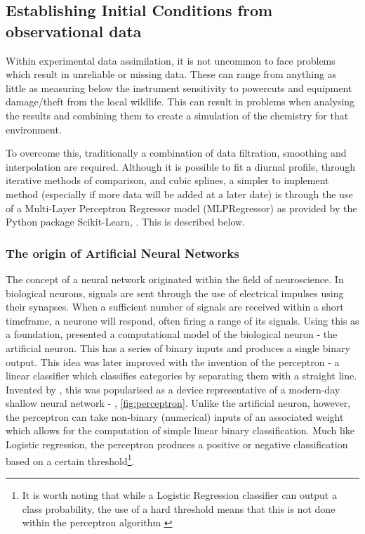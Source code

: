 \subsection{Establishing Initial Conditions from observational data}
Within experimental data assimilation, it is not uncommon to face problems which result in unreliable or missing data. These can range from anything as little as measuring below the instrument sensitivity to powercuts and equipment damage/theft from the local wildlife. This can result in problems when analysing the results and combining them to create a simulation of the chemistry for that environment. 

To overcome this, traditionally a combination of data filtration, smoothing and interpolation are required. Although it is possible to fit a diurnal profile, through iterative methods of comparison, and cubic splines, a simpler to implement method (especially if more data will be added at a later date) is through the use of a Multi-Layer Perceptron Regressor model (MLPRegressor) as provided by the Python package Scikit-Learn, \citep{sklearn}. This is described below.

\subsubsection{The origin of Artificial Neural Networks}
The concept of a neural network originated within the field of neuroscience. In biological neurons, signals are sent through the use of electrical impulses using their synapses. When a sufficient number of signals are received within a short timeframe, a neurone will respond, often firing a range of its signals. Using this as a foundation, \cite{pitts} presented a computational model of the biological neuron - the artificial neuron. This has a series of binary inputs and produces a single binary output. This idea was later improved with the invention of the perceptron - a linear classifier which classifies categories by separating them with a straight line. Invented by \cite{perceptron}, this was popularised as a device representative of a modern-day shallow neural network - \citep{perceptronmanual}, \autoref{fig:perceptron}. Unlike the artificial neuron, however, the perceptron can take non-binary (numerical) inputs of an associated weight which allows for the computation of simple linear binary classification. Much like Logistic regression, the perceptron produces a positive or negative classification based on a certain threshold\footnote{It is worth noting that while a Logistic Regression classifier can output a class probability, the use of a hard threshold means that this is not done within the perceptron algorithm \citep{handsonml}}. 


